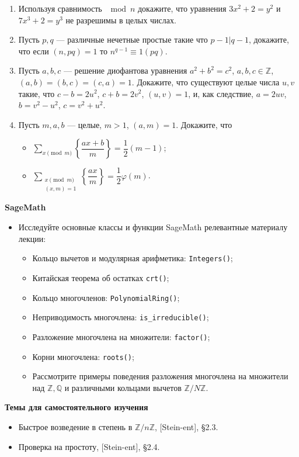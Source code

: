 \begin{enumerate}[topsep=0pt]
    \item Используя сравнимость $\mod n$  докажите, что уравнения $3x^2+2=y^2$ и $7x^3+2=y^3$ не разрешимы в целых числах.
    \item Пусть $p,q$ --- различные нечетные простые такие что $p-1|q-1$, докажите, что если $(n,pq)=1$ то $n^{q-1} \equiv 1 (pq)$.
    \item Пусть $a,b,c$ --- решение диофантова уравнения $a^2+b^2=c^2$, $a,b,c \in \mathbb{Z}$, $(a,b)=(b,c)=(c,a)=1$. Докажите, что существуют целые числа $u,v$ такие, что $c-b=2u^2$, $c+b=2v^2$, $(u,v)=1$, и, как следствие, $a=2uv$, $b=v^2-u^2$, $c=v^2+u^2$.
    \item Пусть $m,a,b$ --- целые, $m>1$, $(a,m)=1$. Докажите, что
    \begin{itemize}
        \item $\sum\limits_{x \pmod m} \left\{ \dfrac{ax+b}{m} \right\} = \dfrac{1}{2}(m-1)$;
        \item $\sum\limits_{\substack{x \pmod m\\(x,m)=1}} \left\{ \dfrac{ax}{m} \right\} = \dfrac{1}{2}\varphi(m)$.
    \end{itemize}
    
\end{enumerate}

\noindent\textbf{SageMath}
\begin{itemize}[topsep=0pt]

    \item Исследуйте основные классы и функции SageMath релевантные материалу лекции:
    \begin{itemize}[noitemsep,topsep=0pt]
        \item Кольцо вычетов и модулярная арифметика: \texttt{Integers()};
        \item Китайская теорема об остатках \texttt{crt()};
        \item Кольцо многочленов: \texttt{PolynomialRing()};
        \item Неприводимость многочлена: \texttt{is\_irreducible()};
        \item Разложение многочлена на множители: \texttt{factor()};
        \item Корни многочлена: \texttt{roots()};
        \item Рассмотрите примеры поведения разложения многочлена на множители над $\mathbb{Z}, \mathbb{Q}$ и различными кольцами вычетов $\mathbb{Z}/N\mathbb{Z}$.
    \end{itemize}
    
\end{itemize}

\noindent\textbf{Темы для самостоятельного изучения}
\begin{itemize}[topsep=0pt]
    \item Быстрое возведение в степень в $\mathbb{Z}/n\mathbb{Z}$, [Stein-ent], \S 2.3.
    \item Проверка на простоту, [Stein-ent], \S 2.4.
\end{itemize}


